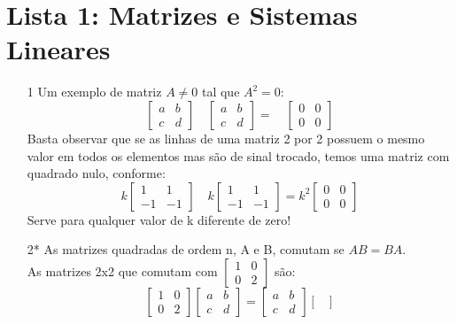 \documentclass[a4paper]{article}
\begin{document}
\section*{Lista 1: Matrizes e Sistemas Lineares}

\begin{itemize}
\item[1] Um exemplo de matriz $A \neq 0$ tal que $A^2=0$:
$$
\left[\begin{array}{rr}
a&b\\
c&d
\end{array}\right]
\quad
\left[\begin{array}{cc}
a&b\\
c&d
\end{array}\right]
=
\quad
\left[\begin{array}{cc}
0&0\\
0&0
\end{array}\right]
$$
\textcolor[rgb]{0,0,1}{Basta observar que se as linhas de uma matriz 2 por 2 possuem o mesmo valor em todos os elementos mas são de sinal trocado, temos uma matriz com quadrado nulo, conforme:
$$
k\left[\begin{array}{rr}
1&1\\
-1&-1
\end{array}\right]
\quad
k\left[\begin{array}{rr}
1&1\\
-1&-1
\end{array}\right]
=
k^2
\left[\begin{array}{cc}
0&0\\
0&0
\end{array}\right]
$$
Serve para qualquer valor de k diferente de zero!
}
\item[2*] As matrizes quadradas de ordem n, A e B, comutam se $AB = BA$. 
\\As matrizes 2x2 que comutam com $\left[\begin{array}{cc}
1&0\\0&2
\end{array}\right]$ são:
$$
\begin{bmatrix}
1&0\\0&2
\end{bmatrix}
\begin{bmatrix}
a&b\\c&d
\end{bmatrix}
=
\begin{bmatrix}
a&b\\c&d
\end{bmatrix}
\begin{bmatrix}

\end{bmatrix}$$
\end{itemize}
\end{document}
